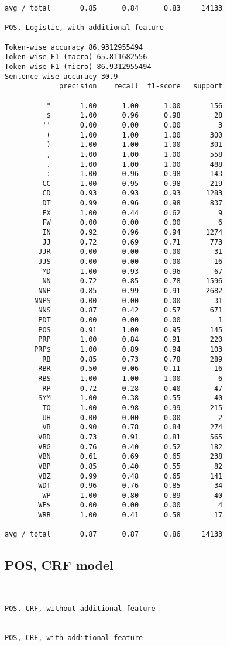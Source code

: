 \documentclass[twoside]{article}
\begin{document}
\begin{lstlisting}
avg / total       0.85      0.84      0.83     14133

POS, Logistic, with additional feature

Token-wise accuracy 86.9312955494
Token-wise F1 (macro) 65.811682556
Token-wise F1 (micro) 86.9312955494
Sentence-wise accuracy 30.9
             precision    recall  f1-score   support

          "       1.00      1.00      1.00       156
          $       1.00      0.96      0.98        28
         ''       0.00      0.00      0.00         3
          (       1.00      1.00      1.00       300
          )       1.00      1.00      1.00       301
          ,       1.00      1.00      1.00       558
          .       1.00      1.00      1.00       488
          :       1.00      0.96      0.98       143
         CC       1.00      0.95      0.98       219
         CD       0.93      0.93      0.93      1283
         DT       0.99      0.96      0.98       837
         EX       1.00      0.44      0.62         9
         FW       0.00      0.00      0.00         6
         IN       0.92      0.96      0.94      1274
         JJ       0.72      0.69      0.71       773
        JJR       0.00      0.00      0.00        31
        JJS       0.00      0.00      0.00        16
         MD       1.00      0.93      0.96        67
         NN       0.72      0.85      0.78      1596
        NNP       0.85      0.99      0.91      2682
       NNPS       0.00      0.00      0.00        31
        NNS       0.87      0.42      0.57       671
        PDT       0.00      0.00      0.00         1
        POS       0.91      1.00      0.95       145
        PRP       1.00      0.84      0.91       220
       PRP$       1.00      0.89      0.94       103
         RB       0.85      0.73      0.78       289
        RBR       0.50      0.06      0.11        16
        RBS       1.00      1.00      1.00         6
         RP       0.72      0.28      0.40        47
        SYM       1.00      0.38      0.55        40
         TO       1.00      0.98      0.99       215
         UH       0.00      0.00      0.00         2
         VB       0.90      0.78      0.84       274
        VBD       0.73      0.91      0.81       565
        VBG       0.76      0.40      0.52       182
        VBN       0.61      0.69      0.65       238
        VBP       0.85      0.40      0.55        82
        VBZ       0.99      0.48      0.65       141
        WDT       0.96      0.76      0.85        34
         WP       1.00      0.80      0.89        40
        WP$       0.00      0.00      0.00         4
        WRB       1.00      0.41      0.58        17

avg / total       0.87      0.87      0.86     14133

\end{lstlisting}
\subsection{POS, CRF model} 
\begin{lstlisting}


POS, CRF, without additional feature


POS, CRF, with additional feature

\end{lstlisting} 
\end{document}
